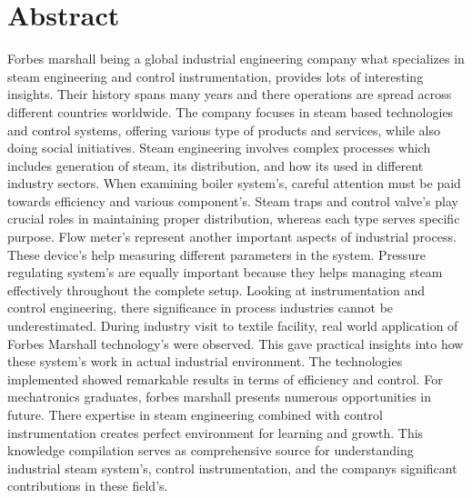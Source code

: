 \section*{Abstract} 
 
Forbes marshall being a global industrial engineering company what specializes in steam engineering and control instrumentation, provides lots of interesting insights. Their history spans many years and there operations are spread across different countries worldwide. The company focuses in steam based technologies and control systems, offering various type of products and services, while also doing social initiatives.
Steam engineering involves complex processes which includes generation of steam, its distribution, and how its used in different industry sectors. When examining boiler system's, careful attention must be paid towards efficiency and various component's. Steam traps and control valve's play crucial roles in maintaining proper distribution, whereas each type serves specific purpose.
Flow meter's represent another important aspects of industrial process. These device's help measuring different parameters in the system. Pressure regulating system's are equally important because they helps managing steam effectively throughout the complete setup. Looking at instrumentation and control engineering, there significance in process industries cannot be underestimated.
During industry visit to textile facility, real world application of Forbes Marshall technology's were observed. This gave practical insights into how these system's work in actual industrial environment. The technologies implemented showed remarkable results in terms of efficiency and control.
For mechatronics graduates, forbes marshall presents numerous opportunities in future. There expertise in steam engineering combined with control instrumentation creates perfect environment for learning and growth. This knowledge compilation serves as comprehensive source for understanding industrial steam system's, control instrumentation, and the companys significant contributions in these field's.

